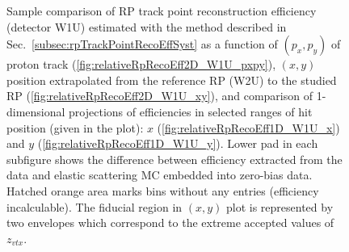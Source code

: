 \begin{figure}[h]
{\begin{subfigure}[b]{\linewidth}
		\end{subfigure}
	}
	\caption[Coparison of estimated RP track point reconstruction efficiency in 2D and 1D (detector W1U).]%
	{Sample comparison of RP track point reconstruction efficiency (detector W1U) estimated with the method described in Sec.~\ref{subsec:rpTrackPointRecoEffSyst} as a function of $(p_{x},p_{y})$ of proton track (\ref{fig:relativeRpRecoEff2D_W1U_pxpy}), $(x,y)$ position extrapolated from the reference RP (W2U) to the studied RP (\ref{fig:relativeRpRecoEff2D_W1U_xy}), and comparison of 1-dimensional projections of efficiencies in selected ranges of hit position (given in the plot): $x$ (\ref{fig:relativeRpRecoEff1D_W1U_x}) and $y$ (\ref{fig:relativeRpRecoEff1D_W1U_y}). Lower pad in each subfigure shows the difference between efficiency extracted from the data and elastic scattering MC embedded into zero-bias data. Hatched orange area marks bins without any entries (efficiency incalculable). The fiducial region in $(x,y)$ plot is represented by two envelopes which correspond to the extreme accepted values of $z_{vtx}$.%
	}\label{fig:relativeRpRecoEff_W1U}
\end{figure}




